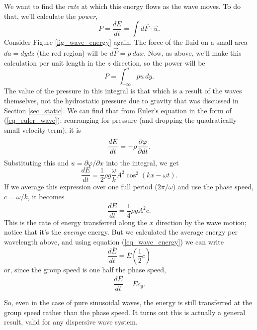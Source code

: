 We want to find the \emph{rate} at which this energy flows as the wave moves.  To do that, we'll calculate the \emph{power}, 
\[
P = \frac{dE}{dt} = \int d\vec{F} \cdot \vec{u}.
\]
Consider Figure \ref{fig_wave_energy} again.  The force of the fluid on a small area $da = dy dz$ (the red region) will be $d\vec{F} = p \ da \unit{x}$.  Now, as above, we'll make this calculation per unit length in the $z$ direction, so the power will be
\begin{equation}
P = \int_{-\infty}^\eta pu \, dy.
\end{equation}
The value of the pressure in this integral is that which is a result of the waves themselves, not the hydrostatic pressure due to gravity that was discussed in Section \ref{sec_static}.  We can find that from Euler's equation in the form of (\ref{eq_euler_wave}); rearranging for pressure (and dropping the quadratically small velocity term), it is
\begin{equation}
\frac{dE}{dt} = -\rho \frac{\partial {\varphi}}{\partial {dt}}.
\end{equation}
Substituting this and $u = \partial \varphi / \partial x$ into the integral, we get
\[
\frac{dE}{dt} = \frac{1}{2} \rho g \frac{\omega}{k} A^2 \cos^2(kx -\omega t).
\]
If we average this expression over one full period ($2\pi / \omega$) and use the phase speed, $c = \omega / k$, it becomes
\begin{equation}
\frac{d\bar{E}}{dt} = \frac{1}{4} \rho g A^2 c.
\end{equation}
This is the rate of energy transferred along the $x$ direction by the wave motion; notice that it's the \emph{average} energy.  But we calculated the average energy per wavelength above, and using equation (\ref{eq_wave_energy}) we can write
\[
\frac{d\bar{E}}{dt} = \bar{E} \left( \frac{1}{2} c \right)
\]
or, since the group speed is one half the phase speed,
\begin{equation}
\frac{d\bar{E}}{dt} = \bar{E} c_g.
\end{equation}

So, even in the case of pure sinusoidal waves, the energy is still transferred at the group speed rather than the phase speed.  It turns out this is actually a general result, valid for any dispersive  wave system.



%
%







